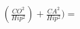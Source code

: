 \documentclass[preview]{standalone}
\begin{document}
\begin{align*}
(\frac{CO^2}{Hip^2})+\frac{CA^2}{Hip^2})=
\end{align*}
\end{document}
